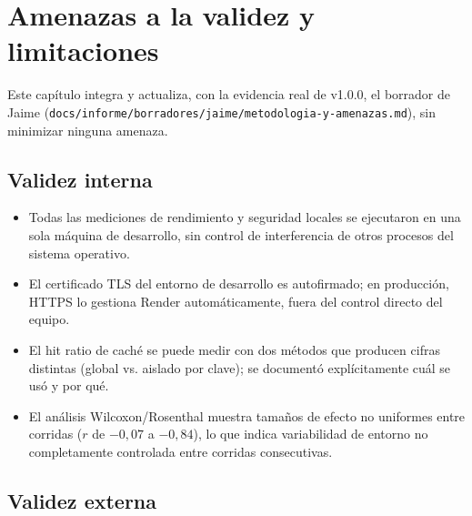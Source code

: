 \chapter{Amenazas a la validez y limitaciones}
\label{cap:amenazas-limitaciones-final}

Este cap\'itulo integra y actualiza, con la evidencia real de v1.0.0, el
borrador de Jaime (\texttt{docs/informe/borradores/jaime/metodologia-y-amenazas.md}),
sin minimizar ninguna amenaza.

\section{Validez interna}

\begin{itemize}[nosep]
  \item Todas las mediciones de rendimiento y seguridad locales se
    ejecutaron en una sola m\'aquina de desarrollo, sin control de
    interferencia de otros procesos del sistema operativo.
  \item El certificado TLS del entorno de desarrollo es autofirmado; en
    producci\'on, HTTPS lo gestiona Render autom\'aticamente, fuera del
    control directo del equipo.
  \item El hit ratio de cach\'e se puede medir con dos m\'etodos que
    producen cifras distintas (global vs. aislado por clave); se document\'o
    expl\'icitamente cu\'al se us\'o y por qu\'e.
  \item El an\'alisis Wilcoxon/Rosenthal muestra tama\~nos de efecto no
    uniformes entre corridas ($r$ de $-0{,}07$ a $-0{,}84$), lo que indica
    variabilidad de entorno no completamente controlada entre corridas
    consecutivas.
\end{itemize}

\section{Validez externa}

